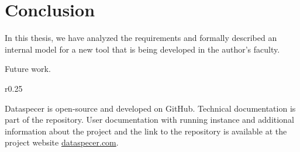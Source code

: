 \chapter*{Conclusion}

In this thesis, we have analyzed the requirements and formally described an internal model for a new tool that is being developed in the author's faculty.

Future work.

\bigskip

\begin{wrapfigure}{r}{0.25\textwidth}
    \centering
    \vspace{-\intextsep}
    \hspace*{-.75\columnsep}
\end{wrapfigure}
Dataspecer is open-source and developed on GitHub. Technical documentation is part of the repository. User documentation with running instance and additional information about the project and the link to the repository is available at the project website \url{dataspecer.com}.
